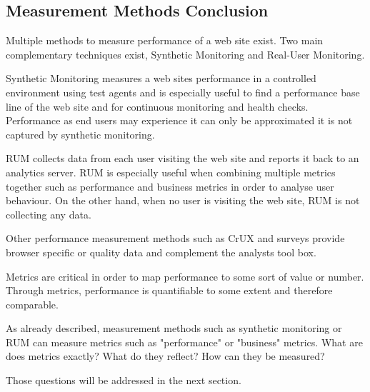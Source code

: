 


\subsection{Measurement Methods Conclusion}


Multiple methods to measure performance of a web site exist.
Two main complementary techniques exist, Synthetic Monitoring and Real-User Monitoring.

Synthetic Monitoring measures a web sites performance in a controlled environment using test agents and is especially useful to find a performance base line of the web site and for continuous monitoring and health checks.
Performance as end users may experience it can only be approximated it is not captured by synthetic monitoring.

RUM collects data from each user visiting the web site and reports it back to an analytics server.
RUM is especially useful when combining multiple metrics together such as performance and business metrics in order to analyse user behaviour.
On the other hand, when no user is visiting the web site, RUM is not collecting any data.

Other performance measurement methods such as CrUX and surveys provide browser specific or quality data and complement the analysts tool box.





Metrics are critical in order to map performance to some sort of value or number.
Through metrics, performance is quantifiable to some extent and therefore comparable.

As already described, measurement methods such as synthetic monitoring or RUM can measure metrics such as "performance" or "business" metrics.
What are does metrics exactly?
What do they reflect?
How can they be measured?

Those questions will be addressed in the next section.









